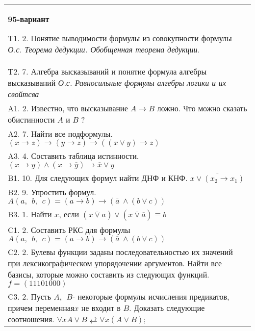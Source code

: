 \documentclass{article}
\begin{document}
\begin{tabular}{m{17cm}}
\textbf{95-вариант}
\newline

T1. 2. Понятие выводимости формулы из совокупности формулы \emph{О.с. Теорема дедукции. Обобщенная теорема дедукции.} \\
T2. 7. Алгебра высказываний и понятие формула алгебры высказываний \emph{О.с. Равносильные формулы алгебры логики и их свойтсва} \\
A1. 2. Известно, что высказывание \(A \rightarrow B\) ложно. Что можно сказать обистинности \(A\) и \(B\) ? \\
A2. 7. Найти все подформулы. \((x \rightarrow z) \rightarrow (y \rightarrow z) \rightarrow ((x \vee y) \rightarrow z)\) \\
A3. 4. Составить таблица истинности. \((x \rightarrow y) \land (x \rightarrow \overline{y}) \rightarrow \overline{x} \vee y\) \\
B1. 10. Для следующих формул найти ДНФ и КНФ. \(\overline{x \vee (x_{2} \rightarrow x_{1})}\) \\
B2. 9. Упростить формул. \(A(a,\ \ b,\ \ c) = (a \rightarrow b) \rightarrow (\overline{a}\  \land (b \vee c))\) \\
B3. 1. Найти \(x\), если \(\left( \overline{x \vee a} \right) \vee \left( \overline{x \vee \overline{a}} \right) \equiv b\) \\
C1. 2. Составить РКС для формулы \(A(a,\ \ b,\ \ c) = (a \rightarrow b) \rightarrow (\overline{a}\  \land (b \vee c))\) \\
C2. 2. Булевы функции заданы последовательностью их значений при лексикографическом упорядочении аргументов. Найти все базисы, которые можно составить из следующих функций. \(f = (11101000)\) \\
C3. 2. Пусть \(A,\ \ B\)- некоторые формулы исчисления предикатов, причем переменная\(x\) не входит в \(B\). Доказать следующие соотношения. \(\forall xA \vee B \rightleftarrows \forall x(A \vee B)\); \\

\end{tabular}
\vspace{1cm}
\end{document}
